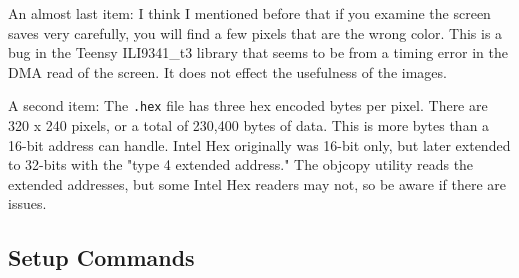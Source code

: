 An almost last item: I think I mentioned before that if you examine the screen saves very carefully, you will find a few pixels that are the wrong color. This is a bug in the Teensy ILI9341\_t3 library that seems to be from a timing error in the DMA read of the screen. It does not effect the usefulness of the images.

A second item: The \texttt{.hex} file has three hex encoded bytes per pixel. There are 320 x 240 pixels, or a total of 230,400 bytes of data. This is more bytes than a 16-bit address can handle. Intel Hex originally was 16-bit only, but later extended to 32-bits with the "type 4 extended address." The objcopy utility reads the extended addresses, but some Intel Hex readers may not, so be aware if there are issues.

\subsection{Setup Commands}
\label{subsect:SerSetup}
